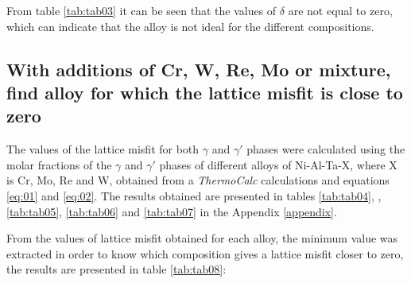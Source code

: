From table \ref{tab:tab03} it can be seen that the values of $\delta$ are not equal to zero, which can indicate that the alloy is not ideal for the different compositions.

\newpage
\subsection{With additions of Cr, W, Re, Mo or mixture, find alloy for which the lattice misfit is close to zero}

The values of the lattice misfit for both $\gamma$ and $\gamma'$ phases were calculated using the molar fractions of the $\gamma$ and $\gamma'$ phases of different alloys of Ni-Al-Ta-X, where X is Cr, Mo, Re and W, obtained from a \textit{ThermoCalc} calculations and equations \ref{eq:01} and \ref{eq:02}. The results obtained are presented in tables \ref{tab:tab04}, ,\ref{tab:tab05}, \ref{tab:tab06} and \ref{tab:tab07} in the Appendix \ref{appendix}.

From the values of lattice misfit obtained for each alloy, the minimum value was extracted in order to know which composition gives a lattice misfit closer to zero, the results are presented in table \ref{tab:tab08}:

